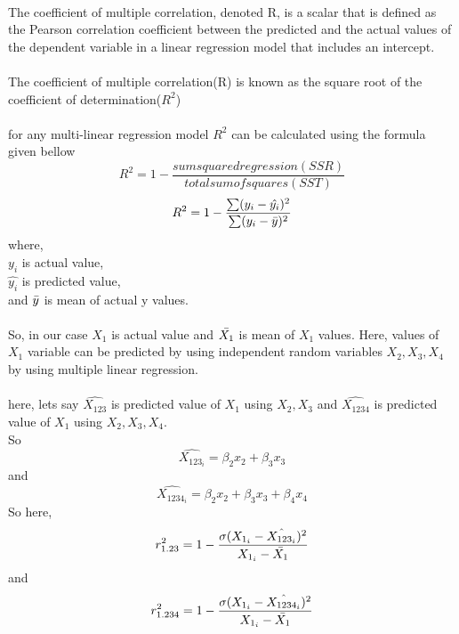 \documentclass{article}
\begin{document}
\paragraph{}
The coefficient of multiple correlation, denoted R, is a scalar that is defined as the Pearson correlation coefficient between the predicted and the actual values of the dependent variable in a linear regression model that includes an intercept.
\\\\
The coefficient of multiple correlation(R) is known as the square root of the coefficient of determination(\(R^2\))
\\\\
for any multi-linear regression model \(R^2\) can be calculated using the formula given bellow\\
\begin{equation}
    R^2 = 1 - \frac{sum squared regression (SSR)}{total sum of squares (SST)}
\end{equation}\begin{equation}
    R^2 = 1 - \frac{\sum(y_i - \hat{y_i})^2}{\sum(y_i - \Bar{y})^2}\\
\end{equation}
where,\\
\hspace*{1em} \quad \quad    \(y_i\) is actual value,\\
\hspace*{1em} \quad \quad    \(\hat{y_i}\) is predicted value,\\
\hspace*{1em} \quad \quad    and \(\Bar{y}\) is mean of actual y values.


\paragraph{}
So, in our case \(X_1\) is actual value and \(\Bar{X_1}\) is mean of \(X_1\) values. Here, values of \(X_1\) variable can be predicted by using independent random variables \(X_2,X_3,X_4\) by using multiple linear regression.
\paragraph{}
here, lets say \(\hat{X_{123}}\) is predicted value of \(X_1\) using \(X_2, X_3\) and \(\hat{X_{1234}}\) is predicted value of \(X_1\) using \(X_2, X_3,X_4\).
\\
So \begin{equation}
    \hat{X_{123_i}} = \beta_2x_2  + \beta_3x_3
\end{equation} 
and \begin{equation}
\hat{X_{1234_i}} = \beta_2x_2 + \beta_3x_3 + \beta_4x_4    
\end{equation}
So here,
\begin{equation}
    r_{1.23}^2 = 1 - \frac{\sigma(X_{1_i} - \hat{X_{123_i}})^2}{X_{1_i} - \Bar{X_1}}
\end{equation}
and
\begin{equation}
    r_{1.234}^2 = 1 - \frac{\sigma(X_{1_i} - \hat{X_{1234_i}})^2}{X_{1_i} - \Bar{X_1}}
\end{equation}
\end{document}
